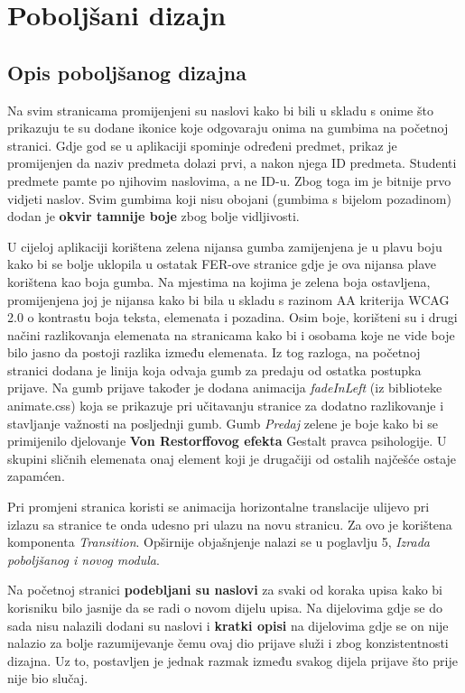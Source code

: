 \documentclass[times, utf8, zavrsni, numeric]{fer}
\begin{document}
        
    \section{Poboljšani dizajn}
    
        \subsection{Opis poboljšanog dizajna}
        Na svim stranicama promijenjeni su naslovi kako bi bili u skladu s onime što prikazuju te su dodane ikonice koje odgovaraju onima na gumbima na početnoj stranici. Gdje god se u aplikaciji spominje određeni predmet, prikaz je promijenjen da naziv predmeta dolazi prvi, a nakon njega ID predmeta. Studenti predmete pamte po njihovim naslovima, a ne ID-u. Zbog toga im je bitnije prvo vidjeti naslov. Svim gumbima koji nisu obojani (gumbima s bijelom pozadinom) dodan je \textbf{okvir tamnije boje} zbog bolje vidljivosti.
        
        U cijeloj aplikaciji korištena zelena nijansa gumba zamijenjena je u plavu boju kako bi se bolje uklopila u ostatak FER-ove stranice gdje je ova nijansa plave korištena kao boja gumba. Na mjestima na kojima je zelena boja ostavljena, promijenjena joj je nijansa kako bi bila u skladu s razinom AA kriterija WCAG 2.0 o kontrastu boja teksta, elemenata i pozadina. Osim boje, korišteni su i drugi načini razlikovanja elemenata na stranicama kako bi i osobama koje ne vide boje bilo jasno da postoji razlika između elemenata. Iz tog razloga, na početnoj stranici dodana je linija koja odvaja gumb za predaju od ostatka postupka prijave. Na gumb prijave također je dodana animacija \textit{fadeInLeft} (iz biblioteke animate.css) koja se prikazuje pri učitavanju stranice za dodatno razlikovanje i stavljanje važnosti na posljednji gumb. Gumb \textit{Predaj} zelene je boje kako bi se primijenilo djelovanje \textbf{Von Restorffovog efekta} Gestalt pravca psihologije. U skupini sličnih elemenata onaj element koji je drugačiji od ostalih najčešće ostaje zapamćen.
        
        Pri promjeni stranica koristi se animacija horizontalne translacije ulijevo pri izlazu sa stranice te onda udesno pri ulazu na novu stranicu. Za ovo je korištena komponenta \textit{Transition}. Opširnije objašnjenje nalazi se u poglavlju 5, \textit{Izrada poboljšanog i novog modula}.
        
        Na početnoj stranici \textbf{podebljani su naslovi} za svaki od koraka upisa kako bi korisniku bilo jasnije da se radi o novom dijelu upisa. Na dijelovima gdje se do sada nisu nalazili dodani su naslovi i \textbf{kratki opisi} na dijelovima gdje se on nije nalazio za bolje razumijevanje čemu ovaj dio prijave služi i zbog konzistentnosti dizajna. Uz to, postavljen je jednak razmak između svakog dijela prijave što prije nije bio slučaj.
        
\end{document}
